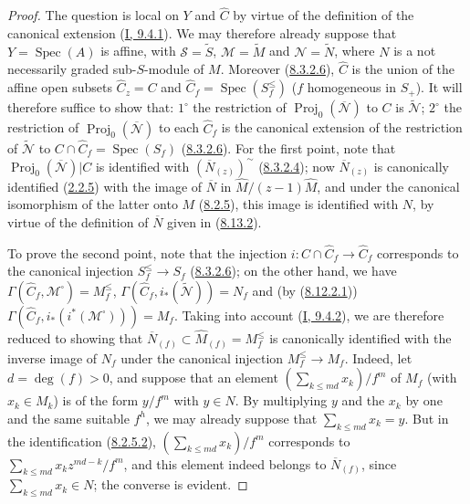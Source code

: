 \begin{proof}
The question is local on $Y$ and $\widehat{C}$ by virtue of the definition of
the canonical extension (\hyperref[I.9.4.1]{I, 9.4.1}). We may therefore
already suppose that $Y=\operatorname{Spec}(A)$ is affine, with
$\mathcal{S}=\widetilde{S}$, $\mathcal{M}=\widetilde{M}$ and
$\mathcal{N}=\widetilde{N}$, where $N$ is a not necessarily graded
sub-$S$-module of $M$. Moreover
(\hyperref[II.8.3.2.6]{8.3.2.6}), $\widehat{C}$ is the union of the affine
open subsets $\widehat{C}_z=C$ and
$\widehat{C}_f=\operatorname{Spec}(S_f^{\leq})$ ($f$ homogeneous in $S_+$).
It will therefore suffice to show that: $1^\circ$ the restriction of
$\operatorname{Proj}_0(\overline{\mathcal{N}})$ to $C$ is
$\widetilde{\mathcal{N}}$; $2^\circ$ the restriction of
$\operatorname{Proj}_0(\overline{\mathcal{N}})$ to each $\widehat{C}_f$ is
the canonical extension of the restriction of $\widetilde{\mathcal{N}}$ to
$C\cap\widehat{C}_f=\operatorname{Spec}(S_f)$
(\hyperref[II.8.3.2.6]{8.3.2.6}). For the first point, note that
$\operatorname{Proj}_0(\overline{\mathcal{N}})|C$ is identified with
$(\overline{N}_{(z)})^{\sim}$
(\hyperref[II.8.3.2.4]{8.3.2.4}); now $\overline{N}_{(z)}$ is canonically
identified (\hyperref[II.2.2.5]{2.2.5}) with the image of
$\overline{N}$ in $\widehat{M}/(z-1)\widehat{M}$, and under the canonical
isomorphism of the latter onto $M$ (\hyperref[II.8.2.5]{8.2.5}), this
image is identified with $N$, by virtue of the definition of $\overline{N}$
given in (\hyperref[II.8.13.2]{8.13.2}).

To prove the second point, note that the injection
$i:C\cap\widehat{C}_f\to\widehat{C}_f$ corresponds to the canonical injection
$S_f^{\leq}\to S_f$ (\hyperref[II.8.3.2.6]{8.3.2.6}); on the other hand, we
have $\Gamma(\widehat{C}_f,\mathcal{M}^{\square})=M_f^{\leq}$,
$\Gamma(\widehat{C}_f,i_*(\widetilde{\mathcal{N}}))=N_f$ and (by
(\hyperref[II.8.12.2.1]{8.12.2.1}))
$\Gamma(\widehat{C}_f,i_*(i^*(\mathcal{M}^{\square})))=M_f$. Taking into
account (\hyperref[I.9.4.2]{I, 9.4.2}), we are therefore reduced to showing
that $\overline{N}_{(f)}\subset\widehat{M}_{(f)}=M_f^{\leq}$ is canonically
identified with the inverse image of $N_f$ under the canonical injection
$M_f^{\leq}\to M_f$. Indeed, let $d=\deg(f)>0$, and suppose that an
element $(\sum_{k\leqslant md}x_k)/f^m$ of $M_f$ (with $x_k\in M_k$) is of
the form $y/f^m$ with $y\in N$. By multiplying $y$ and the $x_k$ by one and
the same suitable $f^h$, we may already suppose that
$\sum_{k\leqslant md}x_k=y$. But in the identification
(\hyperref[II.8.2.5.2]{8.2.5.2}), $(\sum_{k\leqslant md}x_k)/f^m$
corresponds to $\sum_{k\leqslant md}x_kz^{md-k}/f^m$, and this element indeed
belongs to $\overline{N}_{(f)}$, since $\sum_{k\leqslant md}x_k\in N$; the
converse is evident.
\end{proof}


